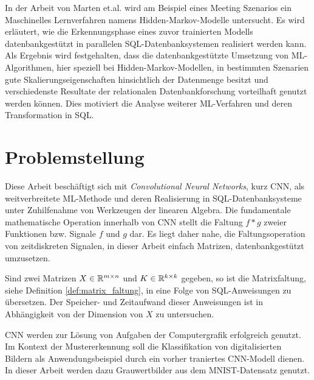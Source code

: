 In der Arbeit von Marten et.al.\cite{marten2017machine} wird am Beispiel eines Meeting Szenarios ein Maschinelles Lernverfahren namens Hidden-Markov-Modelle untersucht. Es wird erläutert, wie die Erkennungsphase eines zuvor trainierten Modells datenbankgestützt in parallelen SQL-Datenbanksystemen realisiert werden kann.   
Als Ergebnis wird festgehalten, dass die datenbankgestützte Umsetzung von ML-Algorithmen, hier speziell bei Hidden-Markov-Modellen, in bestimmten Szenarien gute Skalierungseigenschaften hinsichtlich der Datenmenge besitzt und verschiedenste Resultate der relationalen Datenbankforschung vorteilhaft genutzt werden können. Dies motiviert die Analyse weiterer ML-Verfahren und deren Transformation in SQL. 

\section*{Problemstellung}
\label{abs:problemstellung}
Diese Arbeit beschäftigt sich mit \textit{Convolutional Neural Networks}, kurz CNN, als weitverbreitete ML-Methode und deren Realisierung in SQL-Datenbanksysteme unter Zuhilfenahme von Werkzeugen der linearen Algebra. Die fundamentale mathematische Operation innerhalb von CNN stellt die Faltung $ f \ast g$ zweier Funktionen bzw. Signale $f$ und $g$ dar. 
Es liegt daher nahe, die Faltungsoperation von zeitdiskreten Signalen, in dieser Arbeit einfach Matrizen, datenbankgestützt umzusetzen.

\begin{problem}
    \label{prob:conv_in_sql}
Sind zwei Matrizen $X \in \mathbb{R}^{m \times n}$ und $K \in \mathbb{R}^{k \times k}$ gegeben, so ist die Matrixfaltung, siehe Definition \ref{def:matrix_faltung}, in eine Folge von SQL-Anweisungen zu übersetzen. Der Speicher- und Zeitaufwand dieser Anweisungen ist in Abhängigkeit von der Dimension von $X$ zu untersuchen.   
\end{problem}

CNN werden zur Lösung von Aufgaben der Computergrafik\cite{DBLP:conf/nips/KrizhevskySH12, DBLP:journals/pieee/LeCunBBH98,DBLP:conf/cvpr/CiresanMS12} erfolgreich genutzt.
Im Kontext der Mustererkennung soll die Klassifikation von digitalisierten Bildern als Anwendungsbeispiel durch ein vorher traniertes CNN-Modell dienen. In dieser Arbeit werden dazu Grauwertbilder aus dem MNIST-Datensatz\cite{lecun1998gradient} genutzt. 

